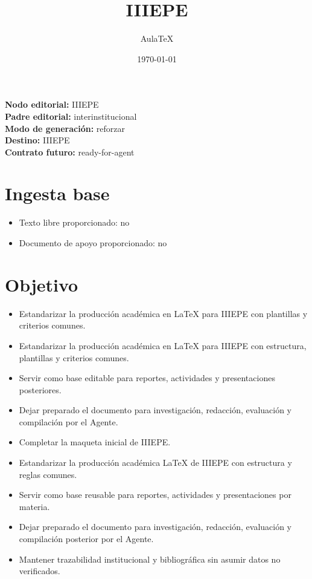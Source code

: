 \documentclass[12pt]{article}
\title{IIIEPE}
\author{AulaTeX}
\date{\today}
\begin{document}
\maketitle

\noindent\textbf{Nodo editorial:} IIIEPE\\
\textbf{Padre editorial:} interinstitucional\\
\textbf{Modo de generación:} reforzar\\
\textbf{Destino:} IIIEPE\\
\textbf{Contrato futuro:} ready-for-agent

\section*{Ingesta base}
\begin{itemize}[leftmargin=*]
  \item Texto libre proporcionado: no
  \item Documento de apoyo proporcionado: no
\end{itemize}

\section*{Objetivo}
\begin{itemize}[leftmargin=*]
  \item Estandarizar la producción académica en LaTeX para IIIEPE con plantillas y criterios comunes.
  \item Estandarizar la producción académica en LaTeX para IIIEPE con estructura, plantillas y criterios comunes.
  \item Servir como base editable para reportes, actividades y presentaciones posteriores.
  \item Dejar preparado el documento para investigación, redacción, evaluación y compilación por el Agente.
  \item Completar la maqueta inicial de IIIEPE.
  \item Estandarizar la producción académica LaTeX de IIIEPE con estructura y reglas comunes.
  \item Servir como base reusable para reportes, actividades y presentaciones por materia.
  \item Dejar preparado el documento para investigación, redacción, evaluación y compilación posterior por el Agente.
  \item Mantener trazabilidad institucional y bibliográfica sin asumir datos no verificados.
\end{itemize}
\end{document}
